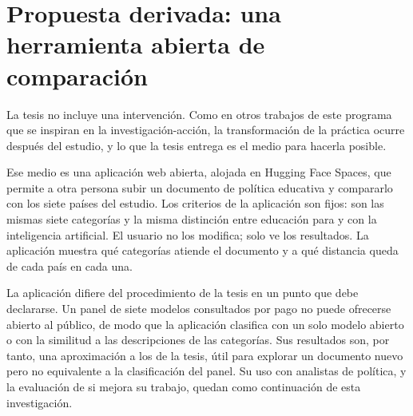 \section{Propuesta derivada: una herramienta abierta de comparación}
\label{sec:propuesta}

La tesis no incluye una intervención. Como en otros trabajos de este programa que se
inspiran en la investigación-acción, la transformación de la práctica ocurre después del
estudio, y lo que la tesis entrega es el medio para hacerla posible.

Ese medio es una aplicación web abierta, alojada en Hugging Face Spaces, que permite a otra
persona subir un documento de política educativa y compararlo con los siete países del
estudio. Los criterios de la aplicación son fijos: son las mismas siete categorías y la
misma distinción entre educación para y con la inteligencia artificial. El usuario no los
modifica; solo ve los resultados. La aplicación muestra qué categorías atiende el documento
y a qué distancia queda de cada país en cada una.

La aplicación difiere del procedimiento de la tesis en un punto que debe declararse. Un
panel de siete modelos consultados por pago no puede ofrecerse abierto al público, de modo
que la aplicación clasifica con un solo modelo abierto o con la similitud a las
descripciones de las categorías. Sus resultados son, por tanto, una aproximación a los de
la tesis, útil para explorar un documento nuevo pero no equivalente a la clasificación del
panel. Su uso con analistas de política, y la evaluación de si mejora su trabajo, quedan
como continuación de esta investigación.
